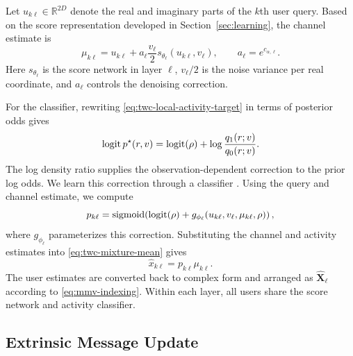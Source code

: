 Let $u_{k\ell}\in\mathbb R^{2D}$ denote the real and imaginary parts
of the $k$th user query. Based on the score representation developed
in Section~\ref{sec:learning}, the channel estimate is
\begin{equation}
 \mu_{k\ell}=u_{k\ell}
       +a_\ell\frac{v_\ell}{2}s_{\theta_\ell}(u_{k\ell},v_\ell),
 \qquad a_\ell=e^{c_{\alpha,\ell}}.
 \label{eq:twc-conditional-mean}
\end{equation}
Here $s_{\theta_\ell}$ is the score network in layer $\ell$,
$v_\ell/2$ is the noise variance per real coordinate, and $a_\ell$
controls the denoising correction.

For the classifier, rewriting \eqref{eq:twc-local-activity-target}
in terms of posterior odds gives
\begin{equation}
 \operatorname{logit} p^\star(r,v)
 =\operatorname{logit}(\rho)+\log\frac{q_1(r;v)}{q_0(r;v)}.
 \label{eq:twc-activity-odds}
\end{equation}
The log density ratio supplies the observation-dependent correction
to the prior log odds. We learn this correction through a classifier
\cite[Sec.~3]{menon2016}.
Using the query and channel estimate, we compute
\begin{equation}
 p_{k\ell}=\operatorname{sigmoid}\!\left(\operatorname{logit}(\rho)+
 g_{\phi_\ell}(u_{k\ell},v_\ell,\mu_{k\ell},\rho)\right),
 \label{eq:twc-activity}
\end{equation}
where $g_{\phi_\ell}$ parameterizes this correction. Substituting
the channel and activity estimates into
\eqref{eq:twc-mixture-mean} gives
\begin{equation}
 \widehat x_{k\ell}=p_{k\ell}\mu_{k\ell}.
 \label{eq:twc-estimate}
\end{equation}
The user estimates are converted back to complex form and arranged
as $\widehat{\mathbf X}_\ell$ according to \eqref{eq:mmv-indexing}.
Within each layer, all users share the score network and activity
classifier.

\subsection{Extrinsic Message Update}

